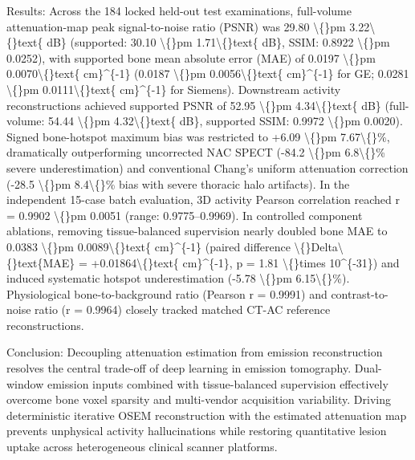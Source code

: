 \documentclass[11pt]{article}
\begin{document}
Results: Across the 184 locked held-out test examinations, full-volume attenuation-map peak signal-to-noise ratio (PSNR) was 29.80 \textbackslash\{\}pm 3.22\textbackslash\{\}text\{ dB\} (supported: 30.10 \textbackslash\{\}pm 1.71\textbackslash\{\}text\{ dB\}, SSIM: 0.8922 \textbackslash\{\}pm 0.0252), with supported bone mean absolute error (MAE) of 0.0197 \textbackslash\{\}pm 0.0070\textbackslash\{\}text\{ cm\}\textasciicircum{}\{-1\} (0.0187 \textbackslash\{\}pm 0.0056\textbackslash\{\}text\{ cm\}\textasciicircum{}\{-1\} for GE; 0.0281 \textbackslash\{\}pm 0.0111\textbackslash\{\}text\{ cm\}\textasciicircum{}\{-1\} for Siemens). Downstream activity reconstructions achieved supported PSNR of 52.95 \textbackslash\{\}pm 4.34\textbackslash\{\}text\{ dB\} (full-volume: 54.44 \textbackslash\{\}pm 4.32\textbackslash\{\}text\{ dB\}, supported SSIM: 0.9972 \textbackslash\{\}pm 0.0020). Signed bone-hotspot maximum bias was restricted to +6.09 \textbackslash\{\}pm 7.67\textbackslash\{\}\%, dramatically outperforming uncorrected NAC SPECT (-84.2 \textbackslash\{\}pm 6.8\textbackslash\{\}\% severe underestimation) and conventional Chang's uniform attenuation correction (-28.5 \textbackslash\{\}pm 8.4\textbackslash\{\}\% bias with severe thoracic halo artifacts). In the independent 15-case batch evaluation, 3D activity Pearson correlation reached r = 0.9902 \textbackslash\{\}pm 0.0051 (range: 0.9775–0.9969). In controlled component ablations, removing tissue-balanced supervision nearly doubled bone MAE to 0.0383 \textbackslash\{\}pm 0.0089\textbackslash\{\}text\{ cm\}\textasciicircum{}\{-1\} (paired difference \textbackslash\{\}Delta\textbackslash\{\}text\{MAE\} = +0.01864\textbackslash\{\}text\{ cm\}\textasciicircum{}\{-1\}, p = 1.81 \textbackslash\{\}times 10\textasciicircum{}\{-31\}) and induced systematic hotspot underestimation (-5.78 \textbackslash\{\}pm 6.15\textbackslash\{\}\%). Physiological bone-to-background ratio (Pearson r = 0.9991) and contrast-to-noise ratio (r = 0.9964) closely tracked matched CT-AC reference reconstructions.\par

Conclusion: Decoupling attenuation estimation from emission reconstruction resolves the central trade-off of deep learning in emission tomography. Dual-window emission inputs combined with tissue-balanced supervision effectively overcome bone voxel sparsity and multi-vendor acquisition variability. Driving deterministic iterative OSEM reconstruction with the estimated attenuation map prevents unphysical activity hallucinations while restoring quantitative lesion uptake across heterogeneous clinical scanner platforms.\par
\end{document}
